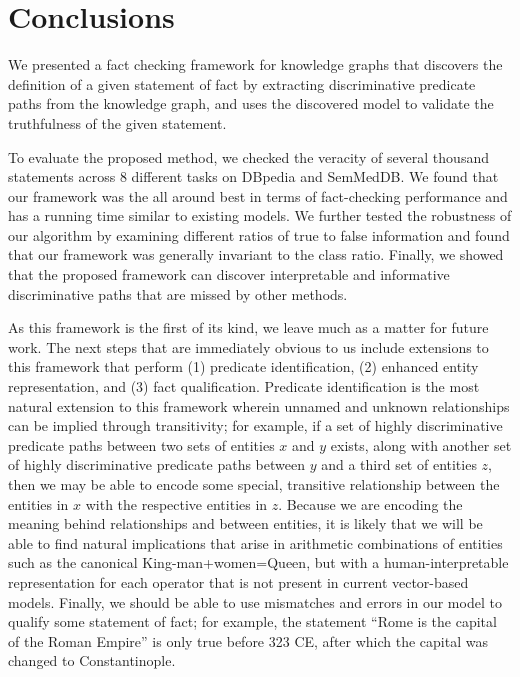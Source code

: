 \documentclass[reprint,twocolumn,showpacs,preprintnumbers,amsmath, aps,pre,amssymb]{revtex4-1}
\begin{document}
\section{Conclusions}
\label{sec:conclusions}

We presented a fact checking framework for knowledge graphs that discovers the definition of a given statement of fact by extracting discriminative predicate paths from the knowledge graph, and uses the discovered model to validate the truthfulness of the given statement.

To evaluate the proposed method, we checked the veracity of several thousand statements across 8 different tasks on DBpedia and SemMedDB. We found that our framework was the all around best in terms of fact-checking performance and has a running time similar to existing models. We further tested the robustness of our algorithm by examining different ratios of true to false information and found that our framework was generally invariant to the class ratio. Finally, we showed that the proposed framework can discover interpretable and informative discriminative paths that are missed by other methods.

As this framework is the first of its kind, we leave much as a matter for future work. The next steps that are immediately obvious to us include extensions to this framework that perform (1) predicate identification, (2) enhanced entity representation, and (3) fact qualification. Predicate identification is the most natural extension to this framework wherein unnamed and unknown relationships can be implied through transitivity; for example, if a set of highly discriminative predicate paths between two sets of entities $x$ and $y$ exists, along with another set of highly discriminative predicate paths between $y$ and a third set of entities $z$, then we may be able to encode some special, transitive relationship between the entities in $x$ with the respective entities in $z$. Because we are encoding the meaning behind relationships and between entities, it is likely that we will be able to find natural implications that arise in arithmetic combinations of entities such as the canonical \textsf{King}-\textsf{man}+\textsf{women}=\textsf{Queen}, but with a human-interpretable representation for each operator that is not present in current vector-based models. Finally, we should be able to use mismatches and errors in our model to qualify some statement of fact; for example, the statement ``Rome is the capital of the Roman Empire'' is only true before 323 CE, after which the capital was changed to Constantinople.
\end{document}
